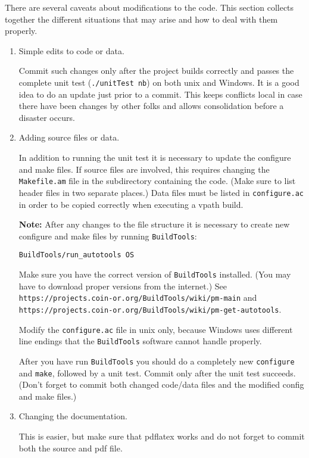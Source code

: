 \label{section:ModifyingProject} 

There are several caveats about modifications to the code. This section collects together the different situations that may arise and how to deal with them properly.

\begin{enumerate}

\item Simple edits to code or data.

Commit such changes only after the project builds correctly and passes the complete unit test 
({\tt ./unitTest nb}) on both unix and Windows. It is a good idea to do an update just prior to a commit. This keeps conflicts local in case there have been changes by other folks and allows consolidation before a disaster occurs. 

\item Adding source files or data.

In addition to running the unit test it is necessary to update the configure and make files. 
If source files are involved, this requires changing the {\tt Makefile.am} file in the subdirectory 
containing the code. (Make sure to list header files in two separate places.) Data files must be listed in 
{\tt configure.ac} in order to be copied correctly when executing a vpath build. 


{\bf Note:} After any changes to the file structure it is necessary to create new configure and make files by running {\tt BuildTools}:
\begin{verbatim}
BuildTools/run_autotools OS
\end{verbatim}

Make sure you have the correct version of {\tt BuildTools} installed. (You may have to download proper versions from the internet.)
See {\tt https://projects.coin-or.org/BuildTools/wiki/pm-main} and  {\tt https://projects.coin-or.org/BuildTools/wiki/pm-get-autotools}.

Modify the {\tt configure.ac} file in unix only, because Windows uses different line endings that the 
{\tt BuildTools} software cannot handle properly. 


\medskip

After you have run {\tt BuildTools} you should do a completely new {\tt configure} and {\tt make}, followed by a unit test. Commit only after the unit test succeeds. (Don't forget to commit both changed code/data files and the modified config and make files.)

\item Changing the documentation.

This is easier, but make sure that pdflatex works and do not forget to commit both the source and pdf file. 

\end{enumerate}

